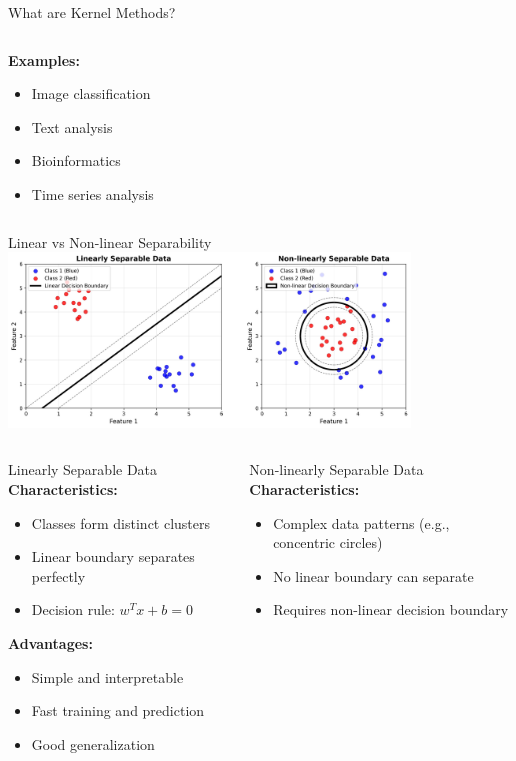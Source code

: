 \documentclass[8pt,aspectratio=1610]{beamer}
\begin{document}
\begin{frame}{What are Kernel Methods?}
\begin{columns}[t]
\begin{column}{0.48\textwidth}
\vspace{0.3cm}
\textbf{Examples:}
\begin{itemize}
\setlength{\itemsep}{1pt}
\item Image classification
\item Text analysis
\item Bioinformatics
\item Time series analysis
\end{itemize}
\end{column}
\end{columns}
\end{frame}

\begin{frame}{Linear vs Non-linear Separability}
\centering
\includegraphics[width=0.8\textwidth]{../figures/linear_vs_nonlinear_data.png}

\vspace{0.2cm}
\begin{columns}[t]
\begin{column}{0.48\textwidth}
\begin{block}{Linearly Separable Data}
\textbf{Characteristics:}
\begin{itemize}
\setlength{\itemsep}{1pt}
\item Classes form distinct clusters
\item Linear boundary separates perfectly
\item Decision rule: $w^T x + b = 0$
\end{itemize}
\end{block}

\textbf{Advantages:}
\begin{itemize}
\setlength{\itemsep}{1pt}
\item Simple and interpretable
\item Fast training and prediction
\item Good generalization
\end{itemize}
\end{column}

\begin{column}{0.48\textwidth}
\begin{block}{Non-linearly Separable Data}
\textbf{Characteristics:}
\begin{itemize}
\setlength{\itemsep}{1pt}
\item Complex data patterns (e.g., concentric circles)
\item No linear boundary can separate
\item Requires non-linear decision boundary
\end{itemize}
\end{block}


\end{column}
\end{columns}
\end{frame}
\end{document}
